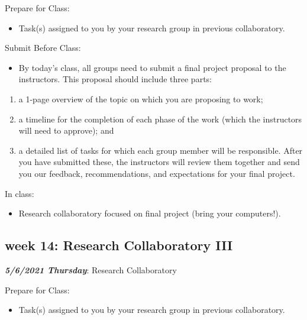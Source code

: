\documentclass[
]{book}
\providecommand{\tightlist}{%
  \setlength{\itemsep}{0pt}\setlength{\parskip}{0pt}}
\begin{document}
Prepare for Class:

\begin{itemize}
\tightlist
\item
  Task(s) assigned to you by your research group in previous collaboratory.
\end{itemize}

Submit Before Class:

\begin{itemize}
\tightlist
\item
  By today's class, all groups need to submit a final project proposal to the instructors. This proposal should include three parts:
\end{itemize}

\begin{enumerate}
\def\labelenumi{(\arabic{enumi})}
\tightlist
\item
  a 1-page overview of the topic on which you are proposing to work;
\item
  a timeline for the completion of each phase of the work (which the instructors will need to approve); and
\item
  a detailed list of tasks for which each group member will be responsible. After you have submitted these, the instructors will review them together and send you our feedback, recommendations, and expectations for your final project.
\end{enumerate}

In class:

\begin{itemize}
\tightlist
\item
  Research collaboratory focused on final project (bring your computers!).
\end{itemize}

\hypertarget{week-14-research-collaboratory-iii}{%
\subsection{week 14: Research Collaboratory III}\label{week-14-research-collaboratory-iii}}

\textbf{\emph{5/6/2021 Thursday}}: Research Collaboratory

Prepare for Class:

\begin{itemize}
\tightlist
\item
  Task(s) assigned to you by your research group in previous collaboratory.
\end{itemize}
\end{document}
